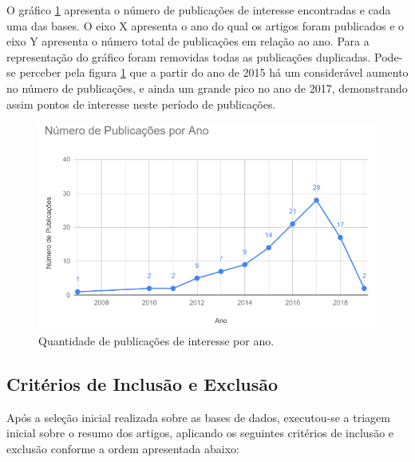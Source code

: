 \documentclass[ti,table]{texufpel} %
\begin{document}
  

O gráfico \ref{fig:grafPublicaAno} apresenta o número de publicações de interesse encontradas e cada uma das bases. O eixo X apresenta o ano do qual os artigos foram publicados e o eixo Y apresenta o número total de publicações em relação ao ano. Para a representação do gráfico foram removidas todas as publicações duplicadas. Pode-se perceber pela figura \ref{fig:grafPublicaAno} que a partir do ano de 2015 há um considerável aumento no número de publicações, e ainda um grande pico no ano de 2017, demonstrando assim pontos de interesse neste período de publicações. 

  

\begin{figure}[ht] 

    \centering 

    \includegraphics[width=.9\textwidth]{imagens/grafPublicaAno.png} 

    \caption{Quantidade de publicações de interesse por ano.} 

    \label{fig:grafPublicaAno} 

\end{figure} 

  

\subsection{Critérios de Inclusão e Exclusão} 

Após a seleção inicial realizada sobre as bases de dados, executou-se a triagem inicial sobre o resumo dos artigos, aplicando os seguintes critérios de inclusão e exclusão conforme a ordem apresentada abaixo:  
\end{document}
